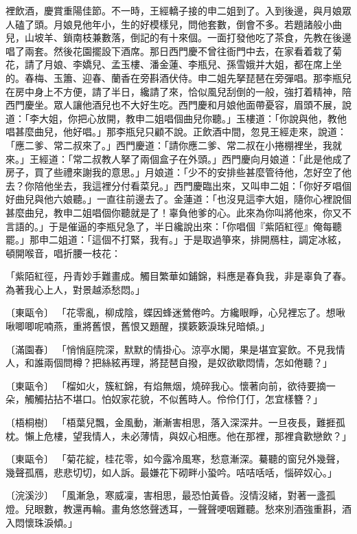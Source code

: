 \begin{showcontents}{}
裡飲酒，慶賞重陽佳節。不一時，王經轎子接的申二姐到了。入到後邊，與月娘眾人磕了頭。月娘見他年小，生的好模樣兒，問他套數，倒會不多。若題諸般小曲兒，山坡羊、鎖南枝兼數落，倒記的有十來個。一面打發他吃了茶食，先教在後邊唱了兩套。然後花園擺設下酒席。那日西門慶不曾往衙門中去，在家看着栽了菊花，請了月娘、李嬌兒、孟玉樓、潘金蓮、李瓶兒、孫雪娥并大姐，都在席上坐的。春梅、玉簫、迎春、蘭香在旁斟酒伏侍。申二姐先拏琵琶在旁彈唱。那李瓶兒在房中身上不方便，請了半日，纔請了來，恰似風兒刮倒的一般，強打着精神，陪西門慶坐。眾人讓他酒兒也不大好生吃。西門慶和月娘他面帶憂容，眉頭不展，說道：「李大姐，你把心放開，教申二姐唱個曲兒你聽。」玉樓道：「你說與他，教他唱甚麼曲兒，他好唱。」那李瓶兒只顧不說。正飲酒中間，忽見王經走來，說道：「應二爹、常二叔來了。」西門慶道：「請你應二爹、常二叔在小捲棚裡坐，我就來。」王經道：「常二叔教人拏了兩個盒子在外頭。」西門慶向月娘道：「此是他成了房子，買了些禮來謝我的意思。」月娘道：「少不的安排些甚麼管待他，怎好空了他去？你陪他坐去，我這裡分付看菜兒。」西門慶臨出來，又叫申二姐：「你好歹唱個好曲兒與他六娘聽。」一直往前邊去了。金蓮道：「也沒見這李大姐，隨你心裡說個甚麼曲兒，教申二姐唱個你聽就是了！辜負他爹的心。此來為你叫將他來，你又不言語的。」于是催逼的李瓶兒急了，半日纔說出來：「你唱個『紫陌紅徑』俺每聽罷。」那申二姐道：「這個不打緊，我有。」于是取過箏來，排開鴈柱，調定冰絃，頓開喉音，唱折腰一枝花：

「紫陌紅徑，丹青妙手難畫成。觸目繁華如鋪錦，料應是春負我，非是辜負了春。為著我心上人，對景越添愁悶。」

〔東甌令〕  「花零亂，柳成陰，蝶因蜂迷鶯倦吟。方纔眼睜，心兒裡忘了。想啾啾唧唧呢喃燕，重將舊恨，舊恨又題醒，撲簌簌淚珠兒暗傾。」

〔滿園春〕  「悄悄庭院深，默默的情掛心。涼亭水閣，果是堪宜宴飲。不見我情人，和誰兩個問樽？把絲絃再理，將琵琶自撥，是奴欲歇悶情，怎如倦聽？」

〔東甌令〕  「榴如火，簇紅錦，有焰無烟，燒碎我心。懷著向前，欲待要摘一朵，觸觸拈拈不堪口。怕奴家花貌，不似舊時人。伶伶仃仃，怎宜樣簪？」

〔梧桐樹〕  「梧葉兒飄，金風動，漸漸害相思，落入深深井。一旦夜長，難捱孤枕。懶上危樓，望我情人，未必薄情，與奴心相應。他在那裡，那裡貪歡戀飲？」

〔東甌令〕  「菊花綻，桂花零，如今露冷風寒，愁意漸深。驀聽的窗兒外幾聲，幾聲孤鴈，悲悲切切，如人訴。最嫌花下砌畔小蛩吟。咭咭咶咶，惱碎奴心。」

〔浣溪沙〕  「風漸急，寒威凜，害相思，最恐怕黃昏。沒情沒緒，對著一盞孤燈。兒眼數，教還再輪。畫角悠悠聲透耳，一聲聲哽咽難聽。愁來別酒強重斟，酒入悶懷珠淚傾。」


\end{showcontents}
